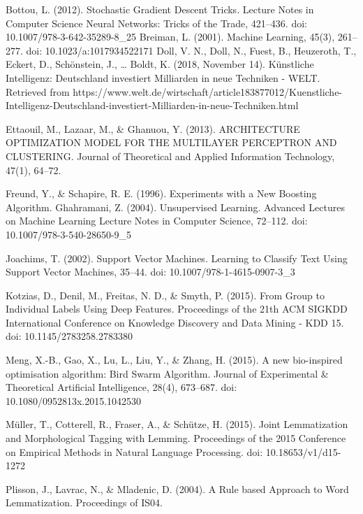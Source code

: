 \documentclass[a4paper,12pt]{article}
\begin{document}
\newpage
\begin{thebibliography}{9}

Bottou, L. (2012). Stochastic Gradient Descent Tricks. Lecture Notes in Computer Science Neural Networks: Tricks of the Trade, 421–436. doi: 10.1007/978-3-642-35289-8\_25
Breiman, L. (2001). Machine Learning, 45(3), 261–277. doi: 10.1023/a:1017934522171
Doll, V. N., Doll, N., Fuest, B., Heuzeroth, T., Eckert, D., Schönstein, J., … Boldt, K. (2018, November 14). Künstliche Intelligenz: Deutschland investiert Milliarden in neue Techniken - WELT. Retrieved from https://www.welt.de/wirtschaft/article183877012/Kuenstliche-Intelligenz-Deutschland-investiert-Milliarden-in-neue-Techniken.html

Ettaouil, M., Lazaar, M., \& Ghanuou, Y. (2013). ARCHITECTURE OPTIMIZATION MODEL FOR THE MULTILAYER PERCEPTRON AND CLUSTERING. Journal of Theoretical and Applied Information Technology, 47(1), 64–72.

Freund, Y., \& Schapire, R. E. (1996). Experiments with a New Boosting Algorithm.
Ghahramani, Z. (2004). Unsupervised Learning. Advanced Lectures on Machine Learning Lecture Notes in Computer Science, 72–112. doi: 10.1007/978-3-540-28650-9\_5

Joachims, T. (2002). Support Vector Machines. Learning to Classify Text Using Support Vector Machines, 35–44. doi: 10.1007/978-1-4615-0907-3\_3

Kotzias, D., Denil, M., Freitas, N. D., \& Smyth, P. (2015). From Group to Individual Labels Using Deep Features. Proceedings of the 21th ACM SIGKDD International Conference on Knowledge Discovery and Data Mining - KDD 15. doi: 10.1145/2783258.2783380 

Meng, X.-B., Gao, X., Lu, L., Liu, Y., \& Zhang, H. (2015). A new bio-inspired optimisation algorithm: Bird Swarm Algorithm. Journal of Experimental \& Theoretical Artificial Intelligence, 28(4), 673–687. doi: 10.1080/0952813x.2015.1042530

Müller, T., Cotterell, R., Fraser, A., \& Schütze, H. (2015). Joint Lemmatization and Morphological Tagging with Lemming. Proceedings of the 2015 Conference on Empirical Methods in Natural Language Processing. doi: 10.18653/v1/d15-1272

Plisson, J., Lavrac, N., \& Mladenic, D. (2004). A Rule based Approach to Word Lemmatization. Proceedings of IS04. 


\end{thebibliography}
\end{document}
